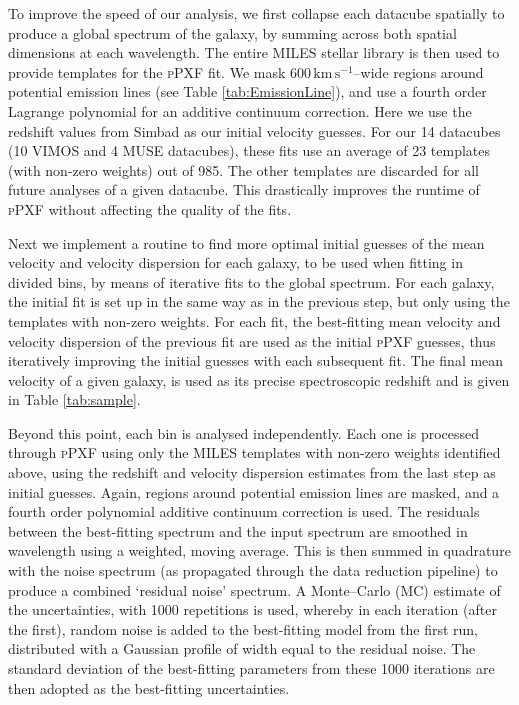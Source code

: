 		To improve the speed of our analysis, we first collapse each datacube spatially to produce a global spectrum of the galaxy, by summing across both spatial dimensions at each wavelength. The entire MILES stellar library \citep{Sanchez-Blazquez2006, Falcon-Barroso2011a} is then used to provide templates for the \textsc{pPXF} fit. We mask $600\,\mathrm{km\,s^{-1}}$--wide regions around potential emission lines (see Table \ref{tab:EmissionLine}), and use a fourth order Lagrange polynomial for an additive continuum correction. Here we use the redshift values from Simbad \citep{Wenger2000} as our initial velocity guesses. For our 14 datacubes (10 VIMOS and 4 MUSE datacubes), these fits use an average of 23 templates (with non-zero weights) out of 985. The other templates are discarded for all future analyses of a given datacube. This drastically improves the runtime of \textsc{pPXF} without affecting the quality of the fits.

		Next we implement a routine to find more optimal initial guesses of the mean velocity and velocity dispersion for each galaxy, to be used when fitting in divided bins, by means of iterative fits to the global spectrum. For each galaxy, the initial fit is set up in the same way as in the previous step, but only using the templates with non-zero weights. For each fit, the best-fitting mean velocity and velocity dispersion of the previous fit are used as the initial \textsc{pPXF} guesses, thus iteratively improving the initial guesses with each subsequent fit. The final mean velocity of a given galaxy, is used as its precise spectroscopic redshift and is given in Table \ref{tab:sample}. 


		Beyond this point, each bin is analysed independently. Each one is processed through \textsc{pPXF} using only the MILES templates with non-zero weights identified above, using the redshift and velocity dispersion estimates from the last step as initial guesses. Again, regions around potential emission lines are masked, and a fourth order polynomial additive continuum correction is used. The residuals between the best-fitting spectrum and the input spectrum are smoothed in wavelength using a weighted, moving average. This is then summed in quadrature with the noise spectrum (as propagated through the data reduction pipeline) to produce a combined `residual noise' spectrum. A Monte--Carlo (MC) estimate of the uncertainties, with 1000 repetitions is used, whereby in each iteration (after the first), random noise is added to the best-fitting model from the first run, distributed with a Gaussian profile of width equal to the residual noise. The standard deviation of the best-fitting parameters from these 1000 iterations are then adopted as the best-fitting uncertainties.

